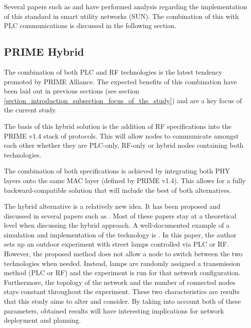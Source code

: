 Several papers such as \cite{theoretical_analysis_of_report_success_probability_in_IEE_802154} and \cite{experimental_perf_evaluation_802154_SUN} have performed analysis regarding the implementation of this standard in smart utility networks (SUN). The combination of this with PLC communications is discussed in the following section.



\subsection{PRIME Hybrid}\label{section_state_of_the art_subsection_prime_hybrid}
The combination of both PLC and RF technologies is the latest tendency promoted by PRIME Alliance. The expected benefits of this combination have been laid out in previous sections (see section \ref{section_introduction_subsection_focus_of_the_study}) and are a key focus of the current study. 

The basis of this hybrid solution is the addition of RF specifications into the PRIME v1.4 stack of protocols. This will allow nodes to communicate amongst each other whether they are PLC-only, RF-only or hybrid nodes containing both technologies. 

The combination of both specifications is achieved by integrating both PHY layers onto the same MAC layer (defined by PRIME v1.4). This allows for a fully backward-compatible solution that will include the best of both alternatives.

The hybrid alternative is a relatively new idea. It has been proposed and discussed in several papers such as \cite{prime_hybrid_solution_combines_plc_and_rf, evolution_of_prime_to_plc_rf_hybrid_systems, toward_more_efficient_more_secure_PLC_RF_Hybrid}. Most of these papers stay at a theoretical level when discussing the hybrid approach. A well-documented example of a simulation and implementation of the technology is \cite{toward_more_efficient_more_secure_PLC_RF_Hybrid}. In this paper, the author sets up an outdoor experiment with street lamps controlled via PLC or RF. However, the proposed method does not allow a node to switch between the two technologies when needed. Instead, lamps are randomly assigned a transmission method (PLC or RF) and the experiment is run for that network configuration. Furthermore, the topology of the network and the number of connected nodes stays constant throughout the experiment. These two characteristics are results that this study aims to alter and consider. By taking into account both of these parameters, obtained results will have interesting implications for network deployment and planning.






 

